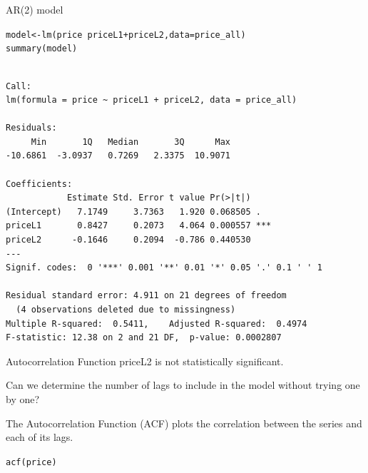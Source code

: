 \documentclass{beamer}\usepackage[]{graphicx}\usepackage[]{color}
\makeatletter
\newcommand{\hlopt}[1]{\textcolor[rgb]{1,0.894,0.769}{#1}}%
\newcommand{\hlstd}[1]{\textcolor[rgb]{1,0.894,0.769}{#1}}%
\newcommand{\hlkwb}[1]{\textcolor[rgb]{0.804,0.776,0.451}{#1}}%
\newcommand{\hlkwc}[1]{\textcolor[rgb]{0.78,0.941,0.545}{#1}}%
\newcommand{\hlkwd}[1]{\textcolor[rgb]{1,0.78,0.769}{#1}}%
\newenvironment{kframe}{%
 \def\at@end@of@kframe{}%
 \ifinner\ifhmode%
  \def\at@end@of@kframe{\end{minipage}}%
  \begin{minipage}{\columnwidth}%
 \fi\fi%
 \def\FrameCommand##1{\hskip\@totalleftmargin \hskip-\fboxsep
 \colorbox{shadecolor}{##1}\hskip-\fboxsep
     \hskip-\linewidth \hskip-\@totalleftmargin \hskip\columnwidth}%
 \MakeFramed {\advance\hsize-\width
   \@totalleftmargin\z@ \linewidth\hsize
   \@setminipage}}%
 {\par\unskip\endMakeFramed%
 \at@end@of@kframe}
\newenvironment{knitrout}{}{} %
\makeatother
\begin{document}
\begin{darkframes}
    \begin{frame}[fragile]{AR(2) model}
      \fontsize{8}{8}\selectfont
\begin{knitrout}
\begin{kframe}
\begin{alltt}
  \hlstd{model} \hlkwb{<-} \hlkwd{lm}\hlstd{(price} \hlopt{~} \hlstd{priceL1} \hlopt{+} \hlstd{priceL2,} \hlkwc{data}\hlstd{=price_all)}
  \hlkwd{summary}\hlstd{(model)}
\end{alltt}
\begin{verbatim}

Call:
lm(formula = price ~ priceL1 + priceL2, data = price_all)

Residuals:
     Min       1Q   Median       3Q      Max 
-10.6861  -3.0937   0.7269   2.3375  10.9071 

Coefficients:
            Estimate Std. Error t value Pr(>|t|)    
(Intercept)   7.1749     3.7363   1.920 0.068505 .  
priceL1       0.8427     0.2073   4.064 0.000557 ***
priceL2      -0.1646     0.2094  -0.786 0.440530    
---
Signif. codes:  0 '***' 0.001 '**' 0.01 '*' 0.05 '.' 0.1 ' ' 1

Residual standard error: 4.911 on 21 degrees of freedom
  (4 observations deleted due to missingness)
Multiple R-squared:  0.5411,	Adjusted R-squared:  0.4974 
F-statistic: 12.38 on 2 and 21 DF,  p-value: 0.0002807
\end{verbatim}
\end{kframe}
\end{knitrout}
    \end{frame}
    
    
    
    \begin{frame}[fragile]{Autocorrelation Function}  
      \fontsize{8}{8}\selectfont
      priceL2 is not statistically significant. \pause
      
      Can we determine the number of lags to include in the model without trying one by one?
      \pause
      
      The \alert{Autocorrelation Function (ACF)} plots the correlation between the series and each of its lags.
\begin{knitrout}
\begin{kframe}
\begin{alltt}
\hlkwd{acf}\hlstd{(price)}
\end{alltt}
\end{kframe}



\end{knitrout}
\end{frame}
\end{darkframes}
\end{document}
